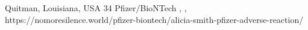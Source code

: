           {Quitman, Louisiana, USA}
          {34}
          {Pfizer/BioNTech}
          {}
          {
            ,
            ,
          }
          {https://nomoresilence.world/pfizer-biontech/alicia-smith-pfizer-adverse-reaction/}

